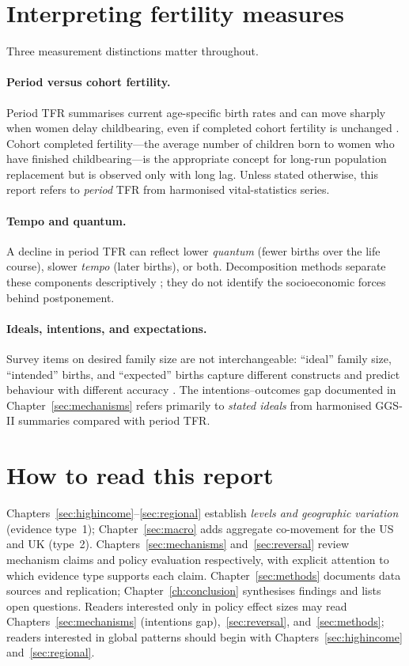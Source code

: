\documentclass[11pt,a4paper,openany]{book}
\begin{document}
\section{Interpreting fertility measures}

Three measurement distinctions matter throughout.

\paragraph{Period versus cohort fertility.}
Period TFR summarises current age-specific birth rates and can move sharply when women delay childbearing, even if completed cohort fertility is unchanged \citep{bongaarts1998,sobotka2017}. Cohort completed fertility---the average number of children born to women who have finished childbearing---is the appropriate concept for long-run population replacement but is observed only with long lag. Unless stated otherwise, this report refers to \emph{period} TFR from harmonised vital-statistics series.

\paragraph{Tempo and quantum.}
A decline in period TFR can reflect lower \emph{quantum} (fewer births over the life course), slower \emph{tempo} (later births), or both. Decomposition methods separate these components descriptively \citep{bongaarts1998}; they do not identify the socioeconomic forces behind postponement.

\paragraph{Ideals, intentions, and expectations.}
Survey items on desired family size are not interchangeable: ``ideal'' family size, ``intended'' births, and ``expected'' births capture different constructs and predict behaviour with different accuracy \citep{bachrach2013,bujard2025}. The intentions--outcomes gap documented in Chapter~\ref{sec:mechanisms} refers primarily to \emph{stated ideals} from harmonised GGS-II summaries compared with period TFR.

\section{How to read this report}

Chapters~\ref{sec:highincome}--\ref{sec:regional} establish \emph{levels and geographic variation} (evidence type~1); Chapter~\ref{sec:macro} adds aggregate co-movement for the US and UK (type~2). Chapters~\ref{sec:mechanisms} and~\ref{sec:reversal} review mechanism claims and policy evaluation respectively, with explicit attention to which evidence type supports each claim. Chapter~\ref{sec:methods} documents data sources and replication; Chapter~\ref{ch:conclusion} synthesises findings and lists open questions. Readers interested only in policy effect sizes may read Chapters~\ref{sec:mechanisms} (intentions gap),~\ref{sec:reversal}, and~\ref{sec:methods}; readers interested in global patterns should begin with Chapters~\ref{sec:highincome} and~\ref{sec:regional}.
\end{document}
